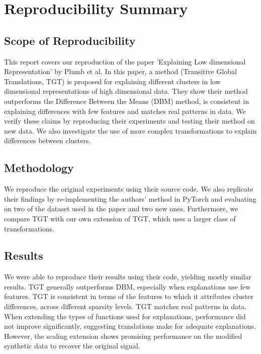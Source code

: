 \section*{\centering Reproducibility Summary}


\subsection*{Scope of Reproducibility}
This report covers our reproduction of the paper 'Explaining Low dimensional Representation' \cite{plumb2020explaining} by Plumb et al. In this paper, a method (Transitive Global Translations, TGT) is proposed for explaining different clusters in low dimensional representations of high dimensional data. They show their method outperforms the Difference Between the Means (DBM) method, is consistent in explaining differences with few features and matches real patterns in data. We verify these claims by reproducing their experiments and testing their method on new data. We also investigate the use of more complex transformations to explain differences between clusters.



\subsection*{Methodology}
We reproduce the original experiments using their source code. We also replicate their findings by re-implementing the authors' method in PyTorch \cite{paszke2019pytorch} and evaluating on two of the dataset used in the paper and two new ones. Furthermore, we compare TGT with our own extension of TGT, which uses a larger class of transformations.

\subsection*{Results}
We were able to reproduce their results using their code, yielding mostly similar results. TGT generally outperforms DBM, especially when explanations use few features. TGT is consistent in terms of the features to which it attributes cluster differences, across different sparsity levels. TGT matches real patterns in data. When extending the types of functions used for explanations, performance did not improve significantly, suggesting translations make for adequate explanations. However, the scaling extension shows promising performance on the modified synthetic data to recover the original signal.


